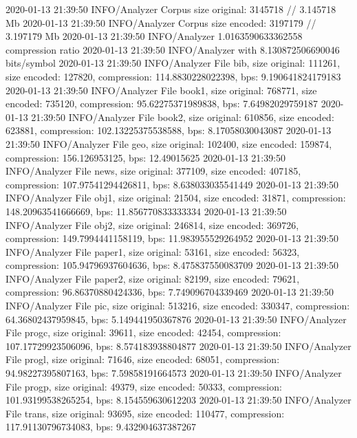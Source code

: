 {2020-01-13 21:39:50 INFO/Analyzer  Corpus size original: 3145718 // 3.145718 Mb  
2020-01-13 21:39:50 INFO/Analyzer  Corpus size encoded: 3197179 // 3.197179 Mb  
2020-01-13 21:39:50 INFO/Analyzer  1.0163590633362558 compression ratio  
2020-01-13 21:39:50 INFO/Analyzer  with 8.130872506690046 bits/symbol  
2020-01-13 21:39:50 INFO/Analyzer  File bib, size original: 111261, size encoded: 127820, compression: 114.8830228022398, bps: 9.190641824179183  
2020-01-13 21:39:50 INFO/Analyzer  File book1, size original: 768771, size encoded: 735120, compression: 95.62275371989838, bps: 7.64982029759187  
2020-01-13 21:39:50 INFO/Analyzer  File book2, size original: 610856, size encoded: 623881, compression: 102.13225375538588, bps: 8.17058030043087  
2020-01-13 21:39:50 INFO/Analyzer  File geo, size original: 102400, size encoded: 159874, compression: 156.126953125, bps: 12.49015625  
2020-01-13 21:39:50 INFO/Analyzer  File news, size original: 377109, size encoded: 407185, compression: 107.97541294426811, bps: 8.638033035541449  
2020-01-13 21:39:50 INFO/Analyzer  File obj1, size original: 21504, size encoded: 31871, compression: 148.20963541666669, bps: 11.856770833333334  
2020-01-13 21:39:50 INFO/Analyzer  File obj2, size original: 246814, size encoded: 369726, compression: 149.7994441158119, bps: 11.983955529264952  
2020-01-13 21:39:50 INFO/Analyzer  File paper1, size original: 53161, size encoded: 56323, compression: 105.94796937604636, bps: 8.475837550083709  
2020-01-13 21:39:50 INFO/Analyzer  File paper2, size original: 82199, size encoded: 79621, compression: 96.86370880424336, bps: 7.749096704339469  
2020-01-13 21:39:50 INFO/Analyzer  File pic, size original: 513216, size encoded: 330347, compression: 64.36802437959845, bps: 5.149441950367876  
2020-01-13 21:39:50 INFO/Analyzer  File progc, size original: 39611, size encoded: 42454, compression: 107.17729923506096, bps: 8.574183938804877  
2020-01-13 21:39:50 INFO/Analyzer  File progl, size original: 71646, size encoded: 68051, compression: 94.98227395807163, bps: 7.59858191664573  
2020-01-13 21:39:50 INFO/Analyzer  File progp, size original: 49379, size encoded: 50333, compression: 101.93199538265254, bps: 8.154559630612203  
2020-01-13 21:39:50 INFO/Analyzer  File trans, size original: 93695, size encoded: 110477, compression: 117.91130796734083, bps: 9.432904637387267 
}

